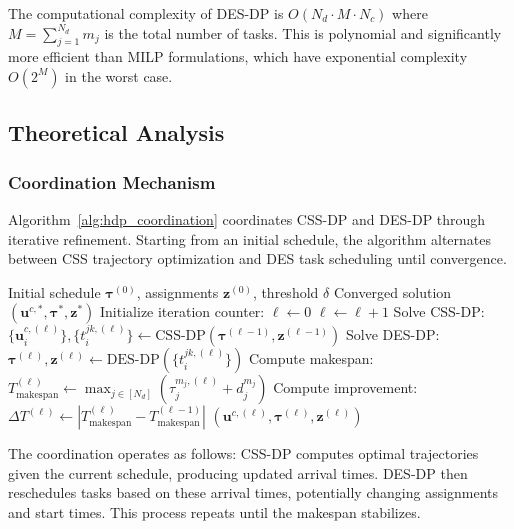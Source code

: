 \documentclass[manuscript,screen,review]{acmart}
\begin{document}
The computational complexity of DES-DP is $O(N_d \cdot M \cdot N_c)$ where 
$M = \sum_{j=1}^{N_d} m_j$ is the total number of tasks. This is polynomial 
and significantly more efficient than MILP formulations, which have exponential 
complexity $O(2^M)$ in the worst case.

\subsection{Theoretical Analysis}

\subsubsection{Coordination Mechanism}

Algorithm~\ref{alg:hdp_coordination} coordinates CSS-DP and DES-DP through 
iterative refinement. Starting from an initial schedule, the algorithm 
alternates between CSS trajectory optimization and DES task scheduling until 
convergence.

\begin{algorithm}[t]
	\caption{HDP Coordination}
	\label{alg:hdp_coordination}
	\small
	\begin{algorithmic}[1]
		\Require Initial schedule $\boldsymbol{\tau}^{(0)}$, assignments $\mathbf{z}^{(0)}$, threshold $\delta$
		\Ensure Converged solution $(\mathbf{u}^{c,*}, \boldsymbol{\tau}^*, \mathbf{z}^*)$
		\State Initialize iteration counter: $\ell \leftarrow 0$
		\Repeat
		\State $\ell \leftarrow \ell + 1$
		\State Solve CSS-DP: $\{\mathbf{u}_i^{c,(\ell)}\}, \{t_i^{jk,(\ell)}\} \leftarrow \text{CSS-DP}(\boldsymbol{\tau}^{(\ell-1)}, \mathbf{z}^{(\ell-1)})$ 
		\State Solve DES-DP: $\boldsymbol{\tau}^{(\ell)}, \mathbf{z}^{(\ell)} \leftarrow \text{DES-DP}(\{t_i^{jk,(\ell)}\})$ 
		\State Compute makespan: $T_{\text{makespan}}^{(\ell)} \leftarrow \max_{j \in [N_d]} (\tau_j^{m_j,(\ell)} + d_j^{m_j})$
		\State Compute improvement: $\Delta T^{(\ell)} \leftarrow |T_{\text{makespan}}^{(\ell)} - T_{\text{makespan}}^{(\ell-1)}|$
		\Return $(\mathbf{u}^{c,(\ell)}, \boldsymbol{\tau}^{(\ell)}, \mathbf{z}^{(\ell)})$
	\end{algorithmic}
\end{algorithm}

The coordination operates as follows: CSS-DP computes optimal trajectories 
given the current schedule, producing updated arrival times. DES-DP then 
reschedules tasks based on these arrival times, potentially changing 
assignments and start times. This process repeats until the makespan 
stabilizes.
\end{document}
